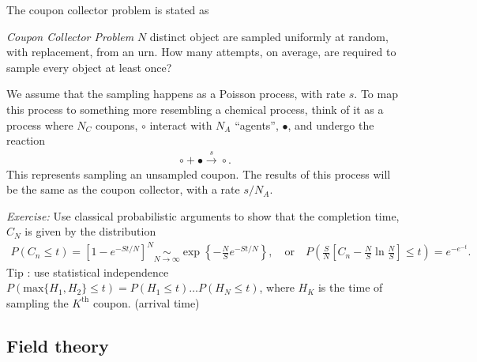 The coupon collector problem is stated as 
%
\begin{framed}\noindent
    \textit{Coupon Collector Problem} $N$ distinct object are sampled uniformly at random, with replacement, from an urn.
    How many attempts, on average, are required to sample every object at least once?
\end{framed}
%
We assume that the sampling happens as a Poisson process, with rate $s$.
To map this process to something more resembling a chemical process, think of it as a process where $N_C$ coupons, $\circ$ interact with $N_A$ ``agents'', $\bullet$, and undergo the reaction
%
\begin{align}
    \circ + \bullet \overset{s}{\longrightarrow} \circ.
\end{align}
%
This represents sampling an unsampled coupon.
The results of this process will be the same as the coupon collector, with a rate $s/N_A$.

\begin{framed}
    \textit{Exercise:}
    Use classical probabilistic arguments to show that the completion time, $C_N$ is given by the distribution
    \begin{align}
        P(C_n \leq t) = [1 - e^{-St/N}]^N \underset{N\rightarrow \infty}{\sim} \exp \left\{ - \frac{ N }{ S } e^{-St/N} \right\}, 
        \quad \text{or} \quad
        P\left(\frac{ S }{ N } \left[C_n - \frac{ N }{ S } \ln \frac{ N }{ S }\right] \leq t\right) = e^{-e^{-t}}.
    \end{align}
    Tip : use statistical independence $P(\mathrm{max}\{H_1, H_2\} \leq t) = P(H_1\leq t) \dots P(H_N\leq t)$, where $H_K$ is the time of sampling the $K^\text{th}$ coupon. (arrival time)
\end{framed}


\subsection*{Field theory}

